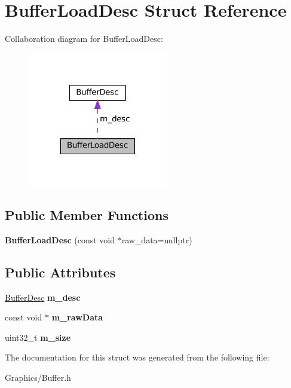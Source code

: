 \hypertarget{structBufferLoadDesc}{}\section{Buffer\+Load\+Desc Struct Reference}
\label{structBufferLoadDesc}


Collaboration diagram for Buffer\+Load\+Desc\+:
\nopagebreak
\begin{figure}[H]
\begin{center}
\leavevmode
\includegraphics[width=173pt]{structBufferLoadDesc__coll__graph}
\end{center}
\end{figure}
\subsection*{Public Member Functions}
\begin{DoxyCompactItemize}
\item 
\mbox{\label{structBufferLoadDesc_a2d469bae2e844f9b0839702622ccf6fc}} 
{\bfseries Buffer\+Load\+Desc} (const void $\ast$raw\+\_\+data=nullptr)
\end{DoxyCompactItemize}
\subsection*{Public Attributes}
\begin{DoxyCompactItemize}
\item 
\mbox{\label{structBufferLoadDesc_a37d56783b4af4e75eb61cf820d7520da}} 
\hyperlink{structBufferDesc}{Buffer\+Desc} {\bfseries m\+\_\+desc}
\item 
\mbox{\label{structBufferLoadDesc_ae67e17527abc39c6045571fe8ea7fc87}} 
const void $\ast$ {\bfseries m\+\_\+raw\+Data}
\item 
\mbox{\label{structBufferLoadDesc_a12152f6fd71fb0ff2e4743d1424c143d}} 
uint32\+\_\+t {\bfseries m\+\_\+size}
\end{DoxyCompactItemize}


The documentation for this struct was generated from the following file\+:\begin{DoxyCompactItemize}
\item 
Graphics/Buffer.\+h\end{DoxyCompactItemize}
